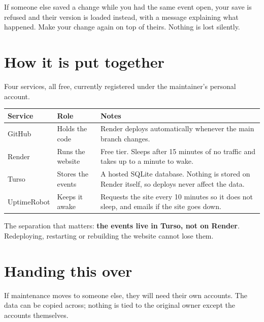 \documentclass[11pt,a4paper]{article}
\begin{document}
If someone else saved a change while you had the same event open, your save is
refused and their version is loaded instead, with a message explaining what
happened. Make your change again on top of theirs. Nothing is lost silently.

\section{How it is put together}

Four services, all free, currently registered under the maintainer's personal
account.

\vspace{0.4em}
\begin{center}
\small
\begin{tabular}{@{}>{\raggedright\arraybackslash}p{2.6cm}>{\raggedright\arraybackslash}p{4.2cm}>{\raggedright\arraybackslash}p{7.6cm}@{}}
\toprule
\textbf{Service} & \textbf{Role} & \textbf{Notes} \\
\midrule
GitHub & Holds the code & Render deploys automatically whenever the main branch changes. \\
Render & Runs the website & Free tier. Sleeps after 15 minutes of no traffic and takes up to a minute to wake. \\
Turso & Stores the events & A hosted SQLite database. Nothing is stored on Render itself, so deploys never affect the data. \\
UptimeRobot & Keeps it awake & Requests the site every 10 minutes so it does not sleep, and emails if the site goes down. \\
\bottomrule
\end{tabular}
\end{center}
\vspace{0.4em}

The separation that matters: \textbf{the events live in Turso, not on Render}.
Redeploying, restarting or rebuilding the website cannot lose them.

\section{Handing this over}
\label{sec:handover}

If maintenance moves to someone else, they will need their own accounts. The
data can be copied across; nothing is tied to the original owner except the
accounts themselves.
\end{document}

